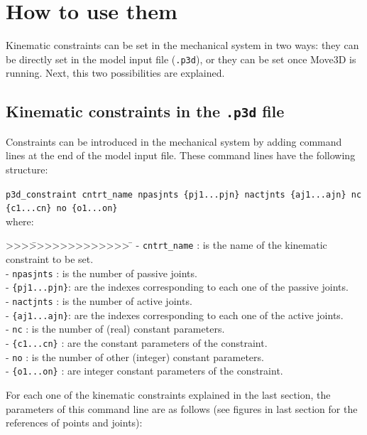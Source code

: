 \section{How to use them}

Kinematic constraints can be set in the mechanical system in two ways: 
they can be directly set in the model input file ({\tt .p3d}), or they can
be set once Move3D is running. Next, this two
possibilities are explained.

\subsection*{Kinematic constraints in the {\tt .p3d} file}

Constraints can be introduced in the mechanical system by adding command 
lines at the end of the model input file. These command lines have the 
following structure: 

\hspace{-4.0mm}
{\tt p3d\_constraint \footnotesize cntrt\_name npasjnts \{pj1...pjn\} nactjnts
  \{aj1...ajn\} nc \{c1...cn\} no \{o1...on\}}  \\

where:
\begin{tabbing}
>>>\=>>>>>>>>>>>>> \= \kill
\> - {\tt cntrt\_name} \>: is the name of the kinematic constraint to 
  be set.\\
\> - {\tt npasjnts}   \>: is the number of passive joints.\\
\> - {\tt \{pj1...pjn\}}\>: are the indexes corresponding to each one of 
  the passive joints.\\
\> - {\tt nactjnts}   \>: is the number of active joints.\\
\> - {\tt \{aj1...ajn\}}\>: are the indexes corresponding to each one of 
  the active joints.\\
\> - {\tt nc}         \>: is the number of (real) constant parameters.\\
\> - {\tt \{c1...cn\}}  \>: are the constant parameters of the
  constraint.\\
\> - {\tt no}          \>: is the number of other (integer) constant parameters.\\
\> - {\tt \{o1...on\}}   \>: are integer constant parameters of the
  constraint.\\
\end{tabbing}

  
For each one of the kinematic constraints explained in
the last section, the parameters of this command line are as follows
(see figures in last section for the references of points and joints):

